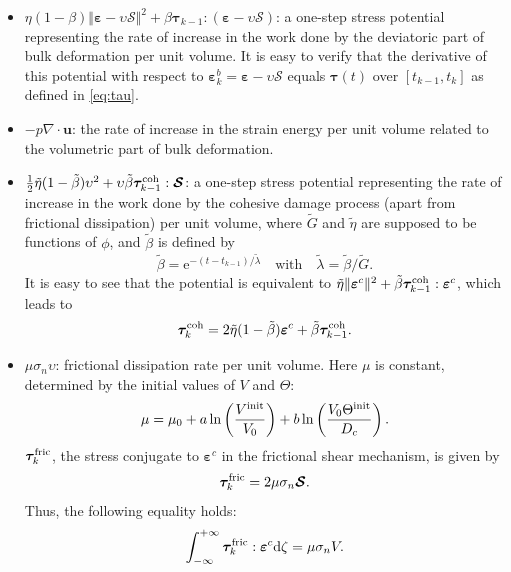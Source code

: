 \documentclass{article}
\begin{document}
\begin{itemize}
  \item $\eta(1 - \beta)\Vert\bm\varepsilon - \upsilon\bm{\mathcal S}\Vert^2 + \beta\bm\tau_{k-1} : (\bm\varepsilon - \upsilon\bm{\mathcal S})$: a one-step stress potential representing the rate of increase in the work done by the deviatoric part of bulk deformation per unit volume. It is easy to verify that the derivative of this potential with respect to $\bm\varepsilon^b_k = \bm\varepsilon - \upsilon\bm{\mathcal S}$ equals $\bm\tau(t)$ over $[t_{k-1},t_k]$ as defined in \eqref{eq:tau}.
  \item $-p\nabla\cdot\bm u$: the rate of increase in the strain energy per unit volume related to the volumetric part of bulk deformation.
  \item $\frac{1}{2}\tilde\eta(1-\tilde\beta)\upsilon^2 + \upsilon\tilde\beta\bm\tau_{k-1}^{\rm coh} : \bm{\mathcal S}$: a one-step stress potential representing the rate of increase in the work done by the cohesive damage process (apart from frictional dissipation) per unit volume, where $\widetilde G$ and $\tilde\eta$ are supposed to be functions of $\phi$, and $\tilde\beta$ is defined by
    \begin{equation}
      \tilde\beta = \mathrm e^{-(t-t_{k-1})/\tilde\lambda}\quad\text{with}\quad\tilde\lambda = \tilde\beta\big/\widetilde G.
    \end{equation}
    It is easy to see that the potential is equivalent to $\tilde\eta\Vert\bm\varepsilon^c\Vert^2 + \tilde\beta\bm\tau_{k-1}^{\rm coh} : \bm\varepsilon^c$, which leads to
    \begin{equation}
      \bm\tau_k^{\rm coh} = 2\tilde\eta(1-\tilde\beta)\bm\varepsilon^c + \tilde\beta\bm\tau_{k-1}^{\rm coh}.
    \end{equation}
  \item $\mu\sigma_n\upsilon$: frictional dissipation rate per unit volume. Here $\mu$ is constant, determined by the initial values of $V$ and $\Theta$:
    \begin{equation}
      \mu = \mu_0 + a\ln\left(\frac{V^{\rm init}}{V_0}\right) + b\ln\left(\frac{V_0\Theta^{\rm init}}{D_c}\right).
    \end{equation}
    $\bm\tau_k^{\rm fric}$, the stress conjugate to $\bm\varepsilon^c$ in the frictional shear mechanism, is given by
    \begin{equation}\label{eq:tau fric}
      \bm\tau_k^{\rm fric} = 2\mu\sigma_n\bm{\mathcal S}.
    \end{equation}
    Thus, the following equality holds:
    \[
      \int_{-\infty}^{+\infty}\bm\tau_k^{\rm fric} : \bm\varepsilon^c\mathrm d\zeta = \mu\sigma_nV.
    \]
\end{itemize}
\end{document}
